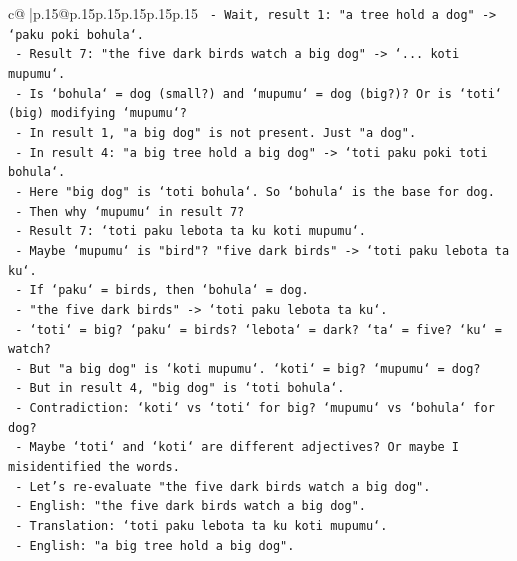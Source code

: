 \documentclass{article}
\begin{document}
{\begin{supertabular}{c@{$\;$}|p{.15\linewidth}@{}p{.15\linewidth}p{.15\linewidth}p{.15\linewidth}p{.15\linewidth}p{.15\linewidth}}
{{{\texttt{               {-} Wait, result 1: "a tree hold a dog" {-}> `paku poki bohula`.} \\
\texttt{               {-} Result 7: "the five dark birds watch a big dog" {-}> `... koti mupumu`.} \\
\texttt{               {-} Is `bohula` = dog (small?) and `mupumu` = dog (big?)? Or is `toti` (big) modifying `mupumu`?} \\
\texttt{               {-} In result 1, "a big dog" is not present. Just "a dog".} \\
\texttt{               {-} In result 4: "a big tree hold a big dog" {-}> `toti paku poki toti bohula`.} \\
\texttt{               {-} Here "big dog" is `toti bohula`. So `bohula` is the base for dog.} \\
\texttt{               {-} Then why `mupumu` in result 7?} \\
\texttt{               {-} Result 7: `toti paku lebota ta ku koti mupumu`.} \\
\texttt{               {-} Maybe `mupumu` is "bird"? "five dark birds" {-}> `toti paku lebota ta ku`.} \\
\texttt{               {-} If `paku` = birds, then `bohula` = dog.} \\
\texttt{               {-} "the five dark birds" {-}> `toti paku lebota ta ku`.} \\
\texttt{               {-} `toti` = big? `paku` = birds? `lebota` = dark? `ta` = five? `ku` = watch?} \\
\texttt{               {-} But "a big dog" is `koti mupumu`. `koti` = big? `mupumu` = dog?} \\
\texttt{               {-} But in result 4, "big dog" is `toti bohula`.} \\
\texttt{               {-} Contradiction: `koti` vs `toti` for big? `mupumu` vs `bohula` for dog?} \\
\texttt{               {-} Maybe `toti` and `koti` are different adjectives? Or maybe I misidentified the words.} \\
\texttt{               {-} Let's re{-}evaluate "the five dark birds watch a big dog".} \\
\texttt{               {-} English: "the five dark birds watch a big dog".} \\
\texttt{               {-} Translation: `toti paku lebota ta ku koti mupumu`.} \\
\texttt{               {-} English: "a big tree hold a big dog".} \\
}}}
\end{supertabular}}
\end{document}

